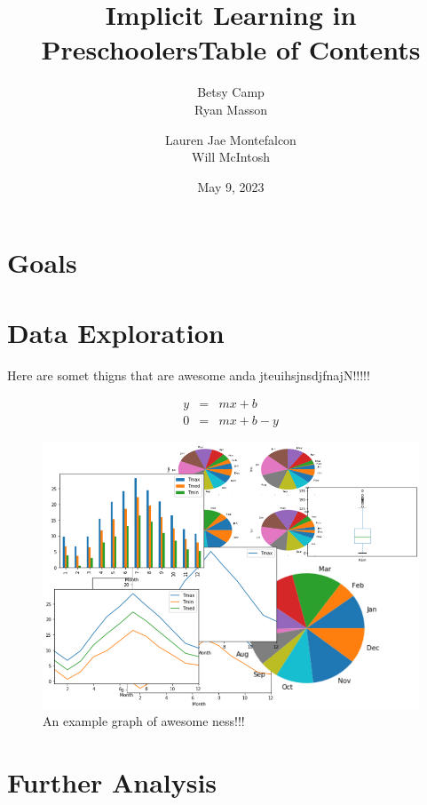 \documentclass{article}
\title{Implicit Learning in Preschoolers}
\author{Betsy Camp\\Ryan Masson \and Lauren Jae Montefalcon\\ Will McIntosh}
\date{May 9, 2023}
\begin{document}
\maketitle

\newpage

\title{Table of Contents}

\section{Goals}

\section{Data Exploration}

Here are somet thigns that are awesome anda jteuihsjnsdjfnajN!!!!!

\begin{eqnarray*}
    y &=& mx+b \\
    0 &=& mx+b-y
\end{eqnarray*}

\begin{figure}[h]
\centering
\includegraphics[scale=0.3]{images/plot.png}
\caption{An example graph of awesome ness!!!}
\label{fig:x cubed graph}
\end{figure}

\section{Further Analysis}
\end{document}
